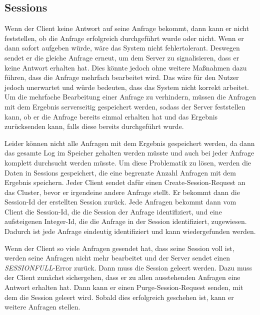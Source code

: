 \subsection{Sessions}
\label{sessions}

Wenn der Client keine Antwort auf seine Anfrage bekommt, dann kann er nicht feststellen, ob die Anfrage erfolgreich durchgeführt wurde oder nicht. Wenn er dann sofort aufgeben würde, wäre das System nicht fehlertolerant. Deswegen sendet er die gleiche Anfrage erneut, um dem Server zu signalisieren, dass er keine Antwort erhalten hat. Dies könnte jedoch ohne weitere Maßnahmen dazu führen, dass die Anfrage mehrfach bearbeitet wird. Das wäre für den Nutzer jedoch unerwartet und würde bedeuten, dass das System nicht korrekt arbeitet. Um die mehrfache Bearbeitung einer Anfrage zu verhindern, müssen die Anfragen mit dem Ergebnis serverseitig gespeichert werden, sodass der Server feststellen kann, ob er die Anfrage bereits einmal erhalten hat und das Ergebnis zurücksenden kann, falls diese bereits durchgeführt wurde.

Leider können nicht alle Anfragen mit dem Ergebnis gespeichert werden, da dann das gesamte Log im Speicher gehalten werden müsste und auch bei jeder Anfrage komplett durchsucht werden müsste. Um diese Problematik zu lösen, werden die Daten in Sessions gespeichert, die eine begrenzte Anzahl Anfragen mit dem Ergebnis speichern. Jeder Client sendet dafür einen Create-Session-Request an das Cluster, bevor er irgendeine andere Anfrage stellt. Er bekommt dann die Session-Id der erstellten Session zurück. Jede Anfragen bekommt dann vom Client die Session-Id, die die Session der Anfrage identifiziert, und eine aufsteigenen Integer-Id, die die Anfrage in der Session identifiziert, zugewiesen. Dadurch ist jede Anfrage eindeutig identifiziert und kann wiedergefunden werden.

Wenn der Client so viele Anfragen gesendet hat, dass seine Session voll ist, werden seine Anfragen nicht mehr bearbeitet und der Server sendet einen \textit{SESSION\textunderscore FULL}-Error zurück. Dann muss die Session geleert werden. Dazu muss der Client zunächst sichergehen, dass er zu allen ausstehenden Anfragen eine Antwort erhalten hat. Dann kann er einen Purge-Session-Request senden, mit dem die Session geleert wird. Sobald dies erfolgreich geschehen ist, kann er weitere Anfragen stellen.

